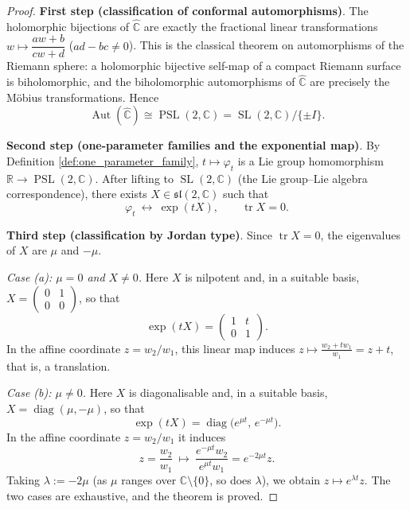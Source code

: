 \begin{proof}
\textbf{First step (classification of conformal automorphisms)}. The holomorphic bijections of $\hat{\mathbb C}$ are exactly the fractional linear transformations $w\mapsto\dfrac{aw+b}{cw+d}$ ($ad-bc\neq0$). This is the classical theorem on automorphisms of the Riemann sphere: a holomorphic bijective self-map of a compact Riemann surface is biholomorphic, and the biholomorphic automorphisms of $\hat{\mathbb C}$ are precisely the Möbius transformations. Hence
\[
\operatorname{Aut}(\hat{\mathbb C})\cong \operatorname{PSL}(2,\mathbb C)=\operatorname{SL}(2,\mathbb C)/\{\pm I\}.
\]

\textbf{Second step (one-parameter families and the exponential map)}. By Definition \ref{def:one_parameter_family}, $t\mapsto\varphi_t$ is a Lie group homomorphism $\mathbb R\to\operatorname{PSL}(2,\mathbb C)$. After lifting to $\operatorname{SL}(2,\mathbb C)$ (the Lie group--Lie algebra correspondence), there exists $X\in\mathfrak{sl}(2,\mathbb C)$ such that
\[
\varphi_t\ \longleftrightarrow\ \exp(tX),\qquad \operatorname{tr}X=0 .
\]

\textbf{Third step (classification by Jordan type)}. Since $\operatorname{tr}X=0$, the eigenvalues of $X$ are $\mu$ and $-\mu$.

\emph{Case (a): $\mu=0$ and $X\neq0$.} Here $X$ is nilpotent and, in a suitable basis, $X=\begin{pmatrix}0&1\\0&0\end{pmatrix}$, so that
\[
\exp(tX)=\begin{pmatrix}1&t\\0&1\end{pmatrix}.
\]
In the affine coordinate $z=w_2/w_1$, this linear map induces $z\mapsto\frac{w_2+tw_1}{w_1}=z+t$, that is, a translation.

\emph{Case (b): $\mu\neq0$.} Here $X$ is diagonalisable and, in a suitable basis, $X=\operatorname{diag}(\mu,-\mu)$, so that
\[
\exp(tX)=\operatorname{diag}\bigl(e^{\mu t},\,e^{-\mu t}\bigr).
\]
In the affine coordinate $z=w_2/w_1$ it induces
\[
z=\frac{w_2}{w_1}\ \longmapsto\ \frac{e^{-\mu t}w_2}{e^{\mu t}w_1}=e^{-2\mu t}z .
\]
Taking $\lambda:=-2\mu$ (as $\mu$ ranges over $\mathbb C\setminus\{0\}$, so does $\lambda$), we obtain $z\mapsto e^{\lambda t}z$. The two cases are exhaustive, and the theorem is proved.
\end{proof}

